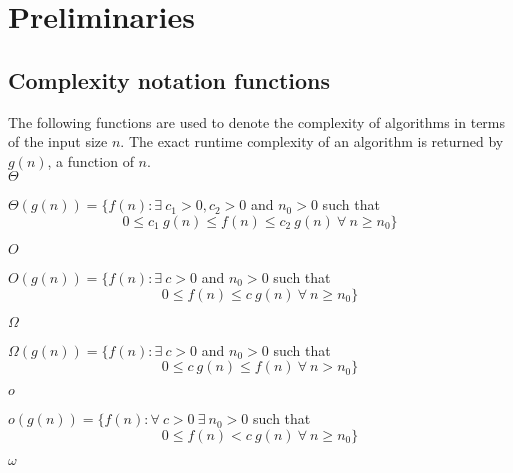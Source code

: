 \chapter{Preliminaries}\label{chapter:list-of-definitions}


\section{Complexity notation functions}\label{section:complexity-notation-functions}

The following functions \cite{Cormen} are used to denote the complexity  of algorithms in terms of the input size $n$. The exact runtime complexity of an algorithm is returned by $g(n)$, a function of $n$.\\

{\boldmath$\Theta$}

$\Theta(g(n)) = \{f(n) : \exists\ c_1>0, c_2>0$ and $n_0>0$ such that \[0 \leq c_1\ g(n) \leq f(n)\leq c_2\ g(n)\ \forall\ n\geq n_0\}
\]

{\boldmath$O$}

$O(g(n)) = \{f(n) : \exists\ c>0$ and $n_0>0$ such that \[0 \leq f(n)\leq c\ g(n)\ \forall\ n\geq n_0\}
\]

{\boldmath$\Omega$}

$\Omega(g(n)) = \{f(n) : \exists\ c>0$ and $n_0>0$ such that \[0 \leq c\ g(n) \leq f(n)\ \forall\ n>n_0\}
\]

{\boldmath$o$}

$o(g(n)) = \{f(n) : \forall\ c>0\ \exists\ n_0>0$ such that \[0 \leq f(n) < c\ g(n)\ \forall\ n\geq n_0\}
\]

{\boldmath$\omega$}

